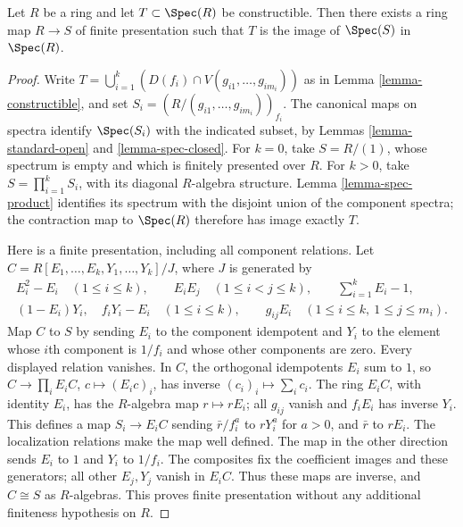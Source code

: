 \begin{lemma}
\label{lemma-constructible-is-image}
Let $R$ be a ring and let $T \subset \Spec(R)$
be constructible. Then there exists a ring map $R \to S$ of
finite presentation such that $T$ is the image of
$\Spec(S)$ in $\Spec(R)$.
\end{lemma}

\begin{proof}
Write
$T=\bigcup_{i=1}^k(D(f_i)\cap V(g_{i1},\ldots,g_{im_i}))$
as in Lemma \ref{lemma-constructible}, and set
$S_i=(R/(g_{i1},\ldots,g_{im_i}))_{f_i}$.
The canonical maps on spectra identify $\Spec(S_i)$ with the indicated
subset, by Lemmas \ref{lemma-standard-open} and \ref{lemma-spec-closed}.
For $k=0$, take $S=R/(1)$, whose spectrum is empty and which is finitely
presented over $R$. For $k>0$, take $S=\prod_{i=1}^kS_i$, with its
diagonal $R$-algebra structure. Lemma \ref{lemma-spec-product} identifies
its spectrum with the disjoint union of the component spectra; the
contraction map to $\Spec(R)$ therefore has image exactly $T$.

\medskip\noindent
Here is a finite presentation, including all component relations. Let
$C=R[E_1,\ldots,E_k,Y_1,\ldots,Y_k]/J$, where $J$ is generated by
$$
\begin{gathered}
E_i^2-E_i\quad(1\leq i\leq k),\qquad
E_iE_j\quad(1\leq i<j\leq k),\qquad
\sum_{i=1}^kE_i-1,\\
(1-E_i)Y_i,\quad f_iY_i-E_i\quad(1\leq i\leq k),\qquad
g_{ij}E_i\quad(1\leq i\leq k,\ 1\leq j\leq m_i).
\end{gathered}
$$
Map $C$ to $S$ by sending $E_i$ to the component idempotent and $Y_i$
to the element whose $i$th component is $1/f_i$ and whose other
components are zero. Every displayed relation vanishes. In $C$, the
orthogonal idempotents $E_i$ sum to $1$, so
$C\longrightarrow\prod_iE_iC$, $c\longmapsto(E_ic)_i$, has inverse
$(c_i)_i\longmapsto\sum_i c_i$. The ring $E_iC$, with identity $E_i$,
has the $R$-algebra map $r\mapsto rE_i$; all $g_{ij}$ vanish and
$f_iE_i$ has inverse $Y_i$. This defines a map $S_i\to E_iC$ sending
$\bar r/f_i^a$ to $rY_i^a$ for $a>0$, and $\bar r$ to $rE_i$.
The localization relations make the map well defined. The map in the
other direction sends $E_i$ to $1$ and $Y_i$ to $1/f_i$.
The composites fix the coefficient images and these generators; all
other $E_j,Y_j$ vanish in $E_iC$. Thus these maps are inverse, and
$C\cong S$ as $R$-algebras. This proves finite presentation without
any additional finiteness hypothesis on $R$.
\end{proof}